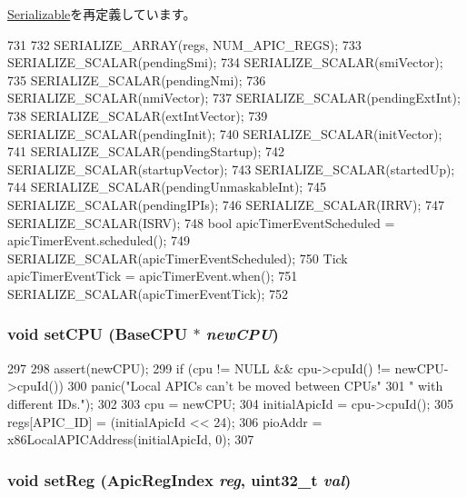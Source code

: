 \hyperlink{classSerializable_ad6272f80ae37e8331e3969b3f072a801}{Serializable}を再定義しています。


\begin{DoxyCode}
731 {
732     SERIALIZE_ARRAY(regs, NUM_APIC_REGS);
733     SERIALIZE_SCALAR(pendingSmi);
734     SERIALIZE_SCALAR(smiVector);
735     SERIALIZE_SCALAR(pendingNmi);
736     SERIALIZE_SCALAR(nmiVector);
737     SERIALIZE_SCALAR(pendingExtInt);
738     SERIALIZE_SCALAR(extIntVector);
739     SERIALIZE_SCALAR(pendingInit);
740     SERIALIZE_SCALAR(initVector);
741     SERIALIZE_SCALAR(pendingStartup);
742     SERIALIZE_SCALAR(startupVector);
743     SERIALIZE_SCALAR(startedUp);
744     SERIALIZE_SCALAR(pendingUnmaskableInt);
745     SERIALIZE_SCALAR(pendingIPIs);
746     SERIALIZE_SCALAR(IRRV);
747     SERIALIZE_SCALAR(ISRV);
748     bool apicTimerEventScheduled = apicTimerEvent.scheduled();
749     SERIALIZE_SCALAR(apicTimerEventScheduled);
750     Tick apicTimerEventTick = apicTimerEvent.when();
751     SERIALIZE_SCALAR(apicTimerEventTick);
752 }
\end{DoxyCode}
\hypertarget{classX86ISA_1_1Interrupts_aa209f4cfe10a4390a73aadcf2d176294}{
\subsubsection[{setCPU}]{\setlength{\rightskip}{0pt plus 5cm}void setCPU ({\bf BaseCPU} $\ast$ {\em newCPU})}}
\label{classX86ISA_1_1Interrupts_aa209f4cfe10a4390a73aadcf2d176294}



\begin{DoxyCode}
297 {
298     assert(newCPU);
299     if (cpu != NULL && cpu->cpuId() != newCPU->cpuId()) {
300         panic("Local APICs can't be moved between CPUs"
301                 " with different IDs.\n");
302     }
303     cpu = newCPU;
304     initialApicId = cpu->cpuId();
305     regs[APIC_ID] = (initialApicId << 24);
306     pioAddr = x86LocalAPICAddress(initialApicId, 0);
307 }
\end{DoxyCode}
\hypertarget{classX86ISA_1_1Interrupts_af0c2ac2127c28e0a1e26b9b005e1bfa1}{
\subsubsection[{setReg}]{\setlength{\rightskip}{0pt plus 5cm}void setReg ({\bf ApicRegIndex} {\em reg}, \/  {\bf uint32\_\-t} {\em val})}}
\label{classX86ISA_1_1Interrupts_af0c2ac2127c28e0a1e26b9b005e1bfa1}



